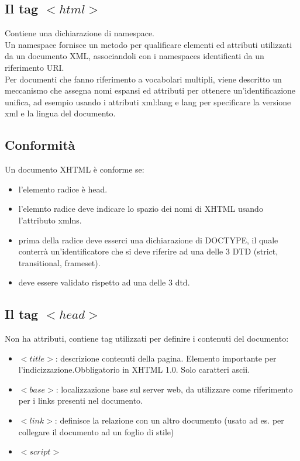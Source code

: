 \documentclass{article}
\begin{document}
\subsection{Il tag $<html>$}
Contiene una dichiarazione di namespace.\\
Un namespace fornisce un metodo per qualificare elementi ed attributi utilizzati da un documento XML, associandoli con i namespaces identificati da un riferimento URI.\\
Per documenti che fanno riferimento a vocabolari multipli, viene descritto un meccanismo che assegna nomi espansi ed attributi per ottenere un'identificazione unifica, ad esempio usando i attributi xml:lang e lang per specificare la versione xml e la lingua del documento.\\
\subsection{Conformità}
Un documento XHTML è conforme se:
\begin{itemize}
	\item l'elemento radice è head.
	\item l'elemnto radice deve indicare lo spazio dei nomi di XHTML usando l'attributo xmlns.
	\item prima della radice deve esserci una dichiarazione di DOCTYPE, il quale conterrà un'identificatore che si deve riferire ad una delle 3 DTD (strict, transitional, frameset).
	\item deve essere validato rispetto ad una delle 3 dtd.
\end{itemize}
\subsection{Il tag $<head>$}
Non ha attributi, contiene tag utilizzati per definire i contenuti del documento:
\begin{itemize}
	\item $<title>$: descrizione contenuti della pagina. Elemento importante per l'indicizzazione.Obbligatorio in XHTML 1.0. Solo caratteri ascii.
	\item $<base>$: localizzazione base sul server web, da utilizzare come riferimento per i links presenti nel documento.
	\item $<link>$: definisce la relazione con un altro documento (usato ad es. per collegare il documento ad un foglio di stile)
	\item $<script>$
\end{itemize}
\end{document}
